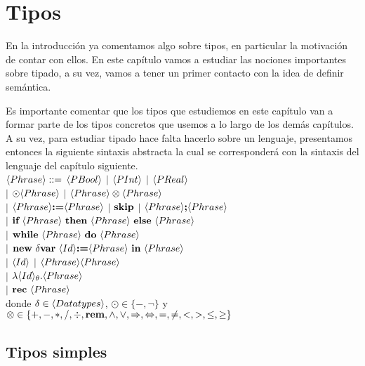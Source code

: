 \chapter{Tipos}
\label{chap:types}

En la introducci\'on ya comentamos algo sobre tipos, en particular la 
motivaci\'on de contar con ellos. En este cap\'itulo vamos a estudiar las 
nociones importantes sobre tipado, a su vez, vamos a tener un primer contacto
con la idea de definir sem\'antica. \

Es importante comentar que los tipos que estudiemos en este cap\'itulo van
a formar parte de los tipos concretos que usemos a lo largo de los dem\'as
cap\'itulos. A su vez, para estudiar tipado hace falta hacerlo sobre un
lenguaje, presentamos entonces la siguiente sintaxis abstracta la cual
se corresponder\'a con la sintaxis del lenguaje del cap\'itulo siguiente. \\

\noindent
$\langle Phrase \rangle ::=$ $\langle PBool \rangle$ $|$ $\langle PInt \rangle$ $|$ $\langle PReal \rangle$ \\
\indent \indent \indent $|$ 
$\odot \langle Phrase \rangle$ $|$ $\langle Phrase \rangle \otimes \langle Phrase \rangle $ \\ 
\indent \indent \indent $|$ 
$\langle Phrase \rangle \textbf{:=} \langle Phrase \rangle$ $|$ $\textbf{skip}$ $|$ $\langle Phrase \rangle \textbf{;} \langle Phrase \rangle$ \\ 
\indent \indent \indent $|$ 
$\textbf{if} \ \langle Phrase \rangle \ \textbf{then} \ \langle Phrase \rangle \ \textbf{else} \ \langle Phrase \rangle$ \\ 
\indent \indent \indent $|$ 
$\textbf{while} \ \langle Phrase \rangle \ \textbf{do} \ \langle Phrase \rangle$ \\ 
\indent \indent \indent $|$ 
$\textbf{new} \ \delta \textbf{var} \ \langle Id \rangle \textbf{:=} \langle Phrase \rangle \ \textbf{in} \ \langle Phrase \rangle$ \\ 
\indent \indent \indent $|$ 
$\langle Id \rangle$ $|$ $\langle Phrase \rangle\langle Phrase \rangle$ \\
\indent \indent \indent $|$ 
$\lambda \langle Id \rangle_{\theta} . \langle Phrase \rangle $ \\
\indent \indent \indent $|$ 
$\textbf{rec} \ \langle Phrase \rangle$
\\

donde $\delta \in \langle Data types \rangle$, $\odot \in \{-, \neg\}$ y 
$\otimes \in \{+,-,*,/,\div,\textbf{rem},\wedge,\vee,\Rightarrow,\Leftrightarrow, =,\neq,<,>,\leq,\geq\}$

\section{Tipos simples}

